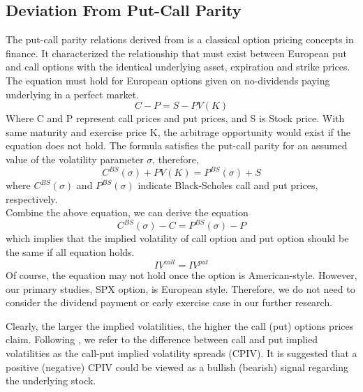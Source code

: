 
\subsection{Deviation From Put-Call Parity}
The put-call parity relations derived from \textcite{stoll1969relationship} is a classical option pricing concepts in finance. It characterized the relationship that must exist between European put and call options with the identical underlying asset, expiration and strike prices. The equation must hold for European options given on no-dividends paying underlying in a perfect market. 
\begin{equation}
C-P = S - PV(K)
\end{equation}
Where C and P represent call prices and put prices, and S is Stock price. With same maturity and exercise price K, the arbitrage opportunity would exist if the equation does not hold. The \textcite{black1973pricing} formula satisfies the put-call parity for an assumed value of the volatility parameter $\sigma$, therefore, 
\begin{equation}
C^{BS}(\sigma ) + PV(K) = P^{BS}(\sigma ) + S
\end{equation}
where $C^{BS}(\sigma )$ and $P^{BS}(\sigma )$ indicate Black-Scholes call and put prices, respectively. 
\\
Combine the above equation, we can derive the equation
\begin{equation}
C^{BS}(\sigma ) - C = P^{BS}(\sigma ) - P
\end{equation}
which implies that the implied volatility of call option and put option should be the same if all equation holds. 
\begin{equation}
IV^{call} = IV^{put}
\end{equation}
Of course, the equation may not hold once the option is American-style. However, our primary studies, SPX option, is European style. Therefore, we do not need to consider the dividend payment or early exercise case in our further research. 

Clearly, the larger the implied volatilities, the higher the call (put) options prices claim. Following \textcite{amin2004index}, we refer to the difference between call and put implied volatilities as the call-put implied volatility spreads (CPIV). It is suggested that a positive (negative) CPIV could be viewed as a bullish (bearish) signal regarding the underlying stock. 

